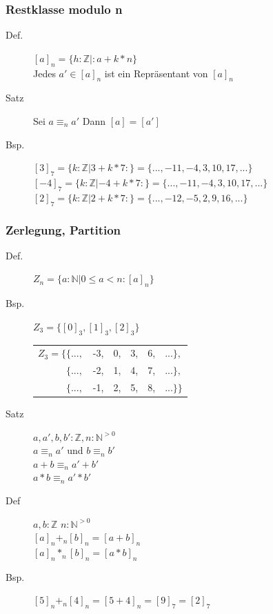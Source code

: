 \documentclass[a4paper,10pt]{article}
\newcommand{\NN}{\mathbb{N}} %
\newcommand{\ZN}{\mathbb{Z}} %
\begin{document}
\subsubsection{Restklasse modulo n}
\begin{description}
	\item[Def.] $[a]_n=\{h:\ZN|:a+k*n\}$ \\
		Jedes $a' \in [a]_n$ ist ein Repr\"asentant von $[a]_n$
	\item[Satz] Sei $a {\equiv}_n a'$ Dann $[a]=[a']$
	\item[Bsp.] $[3]_7 = \{k:\ZN|3+k*7:\} = \{ ..., -11, -4, 3, 10, 17, ...\}$ \\
		$[-4]_7 = \{k:\ZN|-4+k*7:\} = \{ ..., -11, -4, 3, 10, 17, ...\}$\\
		$[2]_7 = \{k:\ZN|2+k*7:\} = \{ ..., -12, -5, 2, 9, 16, ...\}$
\end{description}

\subsubsection{Zerlegung, Partition}
\begin{description}
	\item[Def.] $Z_n = \{a:\NN |0 \leq a < n : [a]_n \}$
	\item[Bsp.] $Z_3= \{[0]_3, [1]_3, [2]_3 \}$ \\
		\begin{tabular}{r c c c c l}
			$Z_3=\{\{ ...,$ & -3, & 0, & 3, & 6, & $...\},$ \\
			$\{ ...,$ & -2, & 1, & 4, & 7, & $...\},$ \\ 
			$\{ ...,$ & -1, & 2, & 5, & 8, & $...\}\}$ \\ 
		\end{tabular}
	\item[Satz] $a,a',b,b':\ZN, n:{\NN}^{>0}$ \\
		$a {\equiv}_n a'$ und $b {\equiv}_n b'$ \\
		$a + b {\equiv}_n a'+b'$ \\
		$a*b {\equiv}_n a' * b'$
	\item[Def] $a,b : \ZN$ $n:{\NN}^{>0}$ \\
		$[a]_n {+}_n [b]_n = [a+b]_n$ \\
		$[a]_n {*}_n [b]_n = [a*b]_n$
	\item[Bsp.] $[5]_n {+}_n [4]_n = [5+4]_n = [9]_7 = [2]_7$
\end{description}
\end{document}
